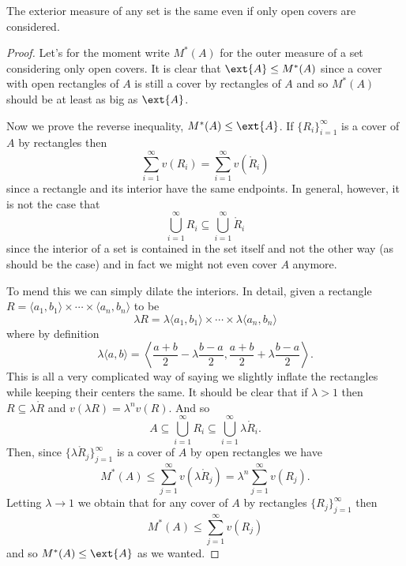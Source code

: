 \documentclass[12pt,oneside]{book}
\begin{document}
\begin{lemma} \label{lemma:exterior measure with open sets}
	The exterior measure of any set is the same even if only open covers are considered.
\end{lemma}
\begin{proof}
	Let's for the moment write \( M^*(A) \) for the outer measure of a set considering only open covers. It is clear that \( \ext{A} \leq M^*(A) \) since a cover with open rectangles of \( A \) is still a cover by rectangles of \( A \) and so \( M^\ast(A) \) should be at least as big as \( \ext{A} \).

	Now we prove the reverse inequality, \( M^\ast(A) \leq \ext{A} \). If \( \{ R_i \}_{i = 1}^{\infty} \) is a cover of \( A \) by rectangles then
	\begin{equation*}
		\sum_{i = 1}^{\infty} v(R_i) = \sum_{i = 1}^{\infty} v(\mathring{R}_i)  
	\end{equation*}
	since a rectangle and its interior have the same endpoints. In general, however, it is not the case that
	\begin{equation*}
		\bigcup_{i = 1}^{\infty} R_i \subseteq \bigcup_{i = 1}^{\infty} \mathring{R}_i
	\end{equation*}
	since the interior of a set is contained in the set itself and not the other way (as should be the case) and in fact we might not even cover \( A \) anymore.

	To mend this we can simply dilate the interiors. In detail, given a rectangle \( R = \langle a_1, b_1 \rangle \times \cdots \times \langle a_n,b_n \rangle \) to be
	\begin{equation*}
		\lambda R = \lambda \langle a_1, b_1 \rangle \times \cdots \times \lambda \langle a_n,b_n \rangle
	\end{equation*}
	where by definition
	\begin{equation*}
		\lambda \langle a, b \rangle = \left\langle \frac{a+b}{2} - \lambda \frac{b - a}{2}, \frac{a + b}{2} + \lambda\frac{b - a}{2} \right\rangle.
	\end{equation*}
	This is all a very complicated way of saying we slightly inflate the rectangles while keeping their centers the same. It should be clear that if \( \lambda > 1 \) then \( R \subseteq \lambda \mathring{R} \) and \( v(\lambda R) = \lambda^n v(R) \). And so
	\begin{equation*}
		A \subseteq \bigcup_{i = 1}^{\infty} R_i \subseteq \bigcup_{i = 1}^{\infty} \lambda \mathring{R}_i.
	\end{equation*}
	Then, since \( \{ \lambda \mathring{R}_j \}_{j = 1}^{\infty} \) is a cover of \( A \) by open rectangles we have
	\begin{equation*}
		M^*(A) \leq \sum_{j = 1}^{\infty} v(\lambda \mathring{R}_j) = \lambda^n \sum_{j = 1}^{\infty} v(R_j).
	\end{equation*}
	Letting \( \lambda \to 1 \) we obtain that for any cover of \( A \) by rectangles \( \{ R_j \}_{j = 1}^\infty \) then
	\begin{equation*}
		M^*(A) \leq \sum_{j = 1}^{\infty} v(R_j)
	\end{equation*}
	and so \( M^*(A) \leq \ext{A} \) as we wanted.
\end{proof}
\end{document}
